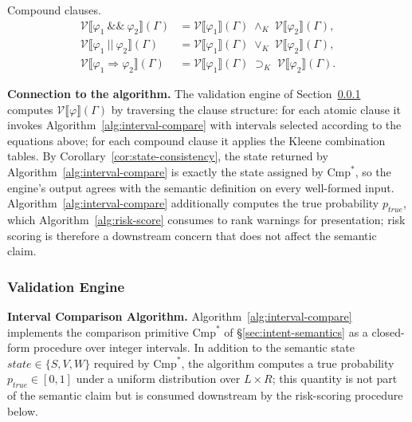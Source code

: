 \documentclass[pdflatex,sn-basic]{sn-jnl}%
\theoremstyle{thmstyleone}%
\theoremstyle{thmstyletwo}%
\theoremstyle{thmstylethree}%
\begin{document}
\smallskip
\noindent Compound clauses.
\begin{align*}
\mathcal{V}\llbracket \varphi_1\ \text{\&\&}\ \varphi_2 \rrbracket(\Gamma)
    &= \mathcal{V}\llbracket \varphi_1 \rrbracket(\Gamma) \;\wedge_K\; \mathcal{V}\llbracket \varphi_2 \rrbracket(\Gamma), \\[3pt]
\mathcal{V}\llbracket \varphi_1\ \text{||}\ \varphi_2 \rrbracket(\Gamma)
    &= \mathcal{V}\llbracket \varphi_1 \rrbracket(\Gamma) \;\vee_K\; \mathcal{V}\llbracket \varphi_2 \rrbracket(\Gamma), \\[3pt]
\mathcal{V}\llbracket \varphi_1 \Rightarrow \varphi_2 \rrbracket(\Gamma)
    &= \mathcal{V}\llbracket \varphi_1 \rrbracket(\Gamma) \;\supset_K\; \mathcal{V}\llbracket \varphi_2 \rrbracket(\Gamma).
\end{align*}

\smallskip
\noindent\textbf{Connection to the algorithm.}
The validation engine of Section~\ref{sec:validation-engine} computes $\mathcal{V}\llbracket \varphi \rrbracket(\Gamma)$ by traversing the clause structure: for each atomic clause it invokes Algorithm~\ref{alg:interval-compare} with intervals selected according to the equations above; for each compound clause it applies the Kleene combination tables.
By Corollary~\ref{cor:state-consistency}, the state returned by Algorithm~\ref{alg:interval-compare} is exactly the state assigned by $\text{Cmp}^*$, so the engine's output agrees with the semantic definition on every well-formed input.
Algorithm~\ref{alg:interval-compare} additionally computes the true probability $p_{\mathit{true}}$, which Algorithm~\ref{alg:risk-score} consumes to rank warnings for presentation; risk scoring is therefore a downstream concern that does not affect the semantic claim.

\subsubsection{Validation Engine}\label{sec:validation-engine}

\smallskip
\noindent\textbf{Interval Comparison Algorithm.}
Algorithm~\ref{alg:interval-compare} implements the comparison primitive $\text{Cmp}^*$ of §\ref{sec:intent-semantics} as a closed-form procedure over integer intervals.
In addition to the semantic state $\mathit{state} \in \{S, V, W\}$ required by $\text{Cmp}^*$, the algorithm computes a true probability $p_{\mathit{true}} \in [0, 1]$ under a uniform distribution over $L \times R$; this quantity is not part of the semantic claim but is consumed downstream by the risk-scoring procedure below.
\end{document}
